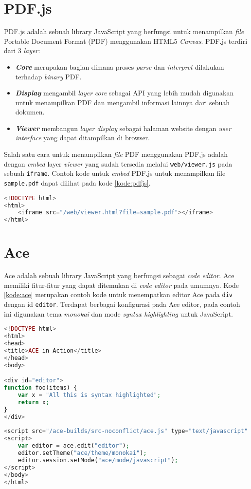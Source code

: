 \section{PDF.js}
\label{sec:pdfjs} 
PDF.js adalah sebuah library JavaScript yang berfungsi untuk menampilkan \textit{file} Portable Document Format (PDF) menggunakan HTML5 \textit{Canvas}. PDF.js terdiri dari 3 \textit{layer}:

\begin{itemize}
	\item \textit{\textbf{Core}} merupakan bagian dimana proses \textit{parse} dan \textit{interpret} dilakukan terhadap \textit{binary} PDF.
	\item \textit{\textbf{Display}} mengambil \textit{layer} \textit{core} sebagai API yang lebih mudah digunakan untuk menampilkan PDF dan mengambil informasi lainnya dari sebuah dokumen.
	\item \textit{\textbf{Viewer}} membangun \textit{layer} \textit{display} sebagai halaman website dengan \textit{user interface} yang dapat ditampilkan di browser.
\end{itemize}

Salah satu cara untuk menampilkan \textit{file} PDF menggunakan PDF.js adalah dengan \textit{embed} layer \textit{viewer} yang sudah tersedia melalui \verb|web/viewer.js| pada sebuah \verb|iframe|. Contoh kode untuk \textit{embed} PDF.js untuk menampilkan file \verb|sample.pdf| dapat dilihat pada kode \ref{kode:pdfjs}.

\begin{lstlisting}[language=php, caption=Contoh kode untuk menggunakan PDF.js, label=kode:pdfjs]
<!DOCTYPE html>
<html>
    <iframe src="/web/viewer.html?file=sample.pdf"></iframe>
</html>
\end{lstlisting}

\section{Ace}
\label{sec:ace} 
Ace adalah sebuah library JavaScript yang berfungsi sebagai \textit{code editor}.
Ace memiliki fitur-fitur yang dapat ditemukan di \textit{code editor} pada umumnya. Kode \ref{kode:ace} merupakan contoh kode untuk menempatkan editor Ace pada \verb|div| dengan id \verb|editor|. Terdapat berbagai konfigurasi pada Ace editor, pada contoh ini digunakan tema \textit{monokai} dan mode \textit{syntax highlighting} untuk JavaScript.

\begin{lstlisting}[language=php, caption=Contoh kode untuk menggunakan Ace, label=kode:ace]
<!DOCTYPE html>
<html>
<head>
<title>ACE in Action</title>
</head>
<body>

<div id="editor">
function foo(items) {
    var x = "All this is syntax highlighted";
    return x;
}
</div>
    
<script src="/ace-builds/src-noconflict/ace.js" type="text/javascript" charset="utf-8"></script>
<script>
    var editor = ace.edit("editor");
    editor.setTheme("ace/theme/monokai");
    editor.session.setMode("ace/mode/javascript");
</script>
</body>
</html>
\end{lstlisting} 

